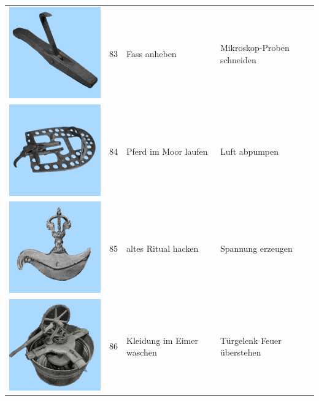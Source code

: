 \documentclass[
  english,
  doc,12pt,twoside,floatsintext]{apa7}
\begin{document}
\begin{center}
\begin{ThreePartTable}
\begin{longtable}{llll}
\includegraphics[valign=c, scale=0.19]{../materials/unfamiliar/83.png} & 83 & Fass anheben & Mikroskop-Proben schneiden\\
\includegraphics[valign=c, scale=0.19]{../materials/unfamiliar/84.png} & 84 & Pferd im Moor laufen & Luft abpumpen\\
\includegraphics[valign=c, scale=0.19]{../materials/unfamiliar/85.png} & 85 & altes Ritual hacken & Spannung erzeugen\\
\includegraphics[valign=c, scale=0.19]{../materials/unfamiliar/86.png} & 86 & Kleidung im Eimer waschen & Türgelenk Feuer überstehen\\

\end{longtable}
\end{ThreePartTable}
\end{center}
\end{document}
